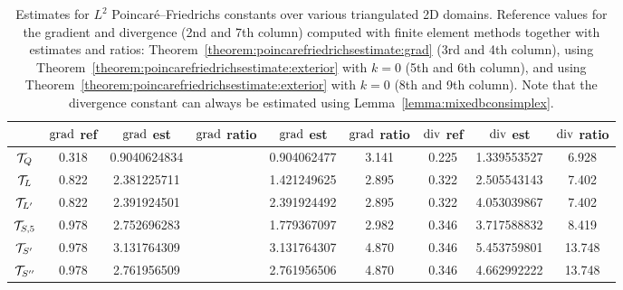 \documentclass[10pt,a4paper]{article}
\begin{document}
\begin{table}[t]
    \centering
    \begin{tabular}{|c||c|c|c|c|c||c|c|c|}
        \hline
                        & $\operatorname{grad}$ ref  & $\operatorname{grad}$ est & $\operatorname{grad}$ ratio & $\operatorname{grad}$ est & $\operatorname{grad}$ ratio      & $\operatorname{div}$ ref  & $\operatorname{div}$ est  & $\operatorname{div}$ ratio \\ 
        \hline
        ${\mathcal T}_{Q}$     & 0.318        & 0.9040624834 &               & 0.904062477        & 3.141        & 0.225              & 1.339553527              &  6.928              \\
        \hline
        ${\mathcal T}_{L}$     & 0.822        & 2.381225711 &               & 1.421249625        & 2.895              & 0.322              & 2.505543143         &  7.402              \\
        \hline
        ${\mathcal T}_{L'}$     & 0.822        & 2.391924501 &               & 2.391924492        & 2.895              & 0.322              & 4.053039867        &  7.402              \\
        \hline
        ${\mathcal T}_{S,5}$     & 0.978        & 2.752696283 &               & 1.779367097       & 2.982              & 0.346              & 3.717588832       &  8.419              \\ 
        \hline %
        ${\mathcal T}_{S'}$    & 0.978        & 3.131764309 &               & 3.131764307       & 4.870              & 0.346              & 5.453759801         & 13.748              \\
        \hline %
        ${\mathcal T}_{S''}$   & 0.978        & 2.761956509 &               & 2.761956506       & 4.870              & 0.346              & 4.662992222         & 13.748              \\
        \hline
    \end{tabular}
    \caption{
    Estimates for $L^2$ Poincar\'e--Friedrichs constants over various triangulated 2D domains.
    Reference values for the gradient and divergence (2nd and 7th column) computed with finite element methods together with estimates and ratios: 
    Theorem~\ref{theorem:poincarefriedrichsestimate:grad} (3rd and 4th column), using Theorem~\ref{theorem:poincarefriedrichsestimate:exterior} with $k=0$ (5th and 6th column), 
    and using Theorem~\ref{theorem:poincarefriedrichsestimate:exterior} with $k=0$ (8th and 9th column).
    Note that the divergence constant can always be estimated using Lemma~\ref{lemma:mixedbconsimplex}.
    }\label{table:estimates2D}
\end{table}
\end{document}
